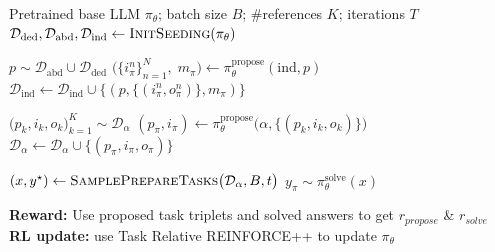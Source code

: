 \documentclass{article}
\begin{document}
\begin{algorithm}[t]
\caption{Self-Play Training of Absolute Zero Reasoner (AZR)}
\label{alg:azr-training}
\begin{algorithmic}[1]
\Require Pretrained base LLM $\pi_\theta$; batch size $B$; \#references $K$; iterations $T$
\State $\mathcal D_{\text{ded}},\mathcal D_{\text{abd}},\mathcal D_{\text{ind}} \gets \textsc{InitSeeding}(\pi_\theta)$ 

    
    \State $p \sim \mathcal D_{\text{abd}} \cup \mathcal D_{\text{ded}}$ 
    \State $\Big(\bigl\{i^n_\pi\bigr\}_{n=1}^{N},\;m_\pi\Big) \gets \pi_\theta^{\text{propose}}(\text{ind},p)$ 
     
        \State $\mathcal D_{\text{ind}} \gets \mathcal D_{\text{ind}} \cup \bigl\{(p,\{(i^n_\pi,o^n_\pi)\},m_\pi)\bigr\}$ 
    \EndIf

      \State $\bigl(p_k,i_k,o_k\bigr)_{k=1}^{K} \sim \mathcal D_{\alpha}$ 
      \State $(p_\pi,i_\pi) \gets \pi_\theta^{\text{propose}}\!\bigl(\alpha,\{(p_k,i_k,o_k)\}\bigr)$
       
        \State $\mathcal D_{\alpha} \gets \mathcal D_{\alpha} \cup \bigl\{(p_\pi,i_\pi,o_\pi)\bigr\}$ 
      \EndIf
    \EndFor
  \EndFor

   
    \State $(x,y^\star) \gets \textsc{SamplePrepareTasks}\bigl(\mathcal D_{\alpha},B,t\bigr)$
    \State $y_\pi \sim \pi_\theta^{\text{solve}}(x)$
  \EndFor

  \State \textbf{Reward:} Use proposed task triplets and solved answers to get $r_{propose}$ \& $r_{solve}$ 
  \State \textbf{RL update:} use Task Relative REINFORCE++ to update $\pi_\theta$ 
\EndFor
\end{algorithmic}
\end{algorithm}
\end{document}
